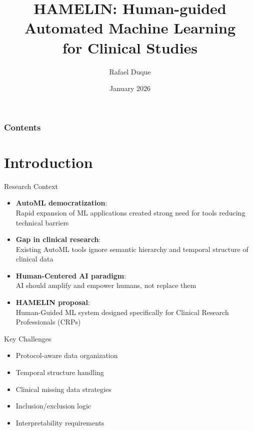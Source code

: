 \documentclass[aspectratio=169,10pt,english,dvipsnames]{beamer}
\title[HAMELIN: Human-Guided AutoML]{HAMELIN: Human-guided Automated Machine Learning\\ for Clinical Studies}
\author[Rafael Duque]{Rafael Duque}
\institute[UC]{Universidad de Cantabria}
\date{January 2026}
\begin{document}
\begin{frame}
    \titlepage
\end{frame}


\begin{frame}[t]
    \frametitle{Contents}
    \tableofcontents
\end{frame}

\section{Introduction}

\begin{frame}{Research Context}
    \begin{minipage}{0.55\textwidth}
        \begin{itemize}
            \item \textbf{AutoML democratization}:\\
            Rapid expansion of ML applications created strong need for tools reducing technical barriers
            
            \item \textbf{Gap in clinical research}:\\
            Existing AutoML tools ignore semantic hierarchy and temporal structure of clinical data
            
            \item \textbf{Human-Centered AI paradigm}:\\
            AI should amplify and empower humans, not replace them
            
            \item \textbf{HAMELIN proposal}:\\
            Human-Guided ML system designed specifically for Clinical Research Professionals (CRPs)
        \end{itemize}
    \end{minipage}%
    \begin{minipage}{0.45\textwidth}
        \centering
        \scriptsize
        \begin{block}{Key Challenges}
            \begin{itemize}
                \item Protocol-aware data organization
                \item Temporal structure handling
                \item Clinical missing data strategies
                \item Inclusion/exclusion logic
                \item Interpretability requirements
            \end{itemize}
        \end{block}
        

\end{minipage}
\end{frame}
\end{document}
